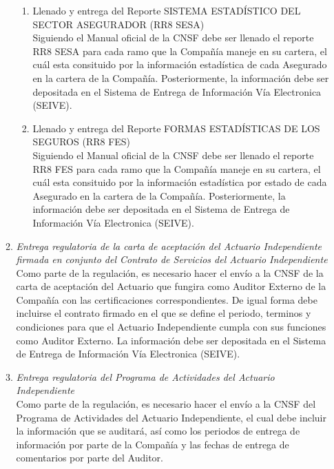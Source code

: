 \documentclass[11pt,twoside,openright,spanish]{report}
\numberwithin{equation}{chapter}
\numberwithin{figure}{chapter}
\numberwithin{table}{chapter}
\begin{document}
\begin{singlespace}
\begin{enumerate}
\begin{enumerate}
\begin{enumerate}
				\item {Llenado y entrega del Reporte SISTEMA ESTADÍSTICO DEL SECTOR ASEGURADOR (RR8 SESA)} \\ \-\hspace{0.5cm}
				Siguiendo el Manual oficial de la CNSF debe ser llenado el reporte RR8 SESA para cada ramo que la Compañía maneje en su cartera, el cuál esta consituido por la información estadística de cada Asegurado en la cartera de la Compañía. Posteriormente, la información debe ser depositada en el Sistema de Entrega de Información Vía Electronica (SEIVE).
				\item {Llenado y entrega del Reporte FORMAS ESTADÍSTICAS DE LOS SEGUROS (RR8 FES)} \\ \-\hspace{0.5cm}
				Siguiendo el Manual oficial de la CNSF debe ser llenado el reporte RR8 FES para cada ramo que la Compañía maneje en su cartera, el cuál esta consituido por la información estadística por estado de cada Asegurado en la cartera de la Compañía. Posteriormente, la información debe ser depositada en el Sistema de Entrega de Información Vía Electronica (SEIVE).
			\end{enumerate}
			\item \textit{Entrega regulatoria de la carta de aceptación del Actuario Independiente firmada en conjunto del Contrato de Servicios del Actuario Independiente} \\ \-\hspace{0.5cm}
			Como parte de la regulación, es necesario hacer el envío a la CNSF de la carta de aceptación del Actuario que fungira como Auditor Externo de la Compañía con las certificaciones correspondientes. De igual forma debe incluirse el contrato firmado en el que se define el periodo, terminos y condiciones para que el Actuario Independiente cumpla con sus funciones como Auditor Externo. La información debe ser depositada en el Sistema de Entrega de Información Vía Electronica (SEIVE).
			\item \textit{Entrega regulatoria del Programa de Actividades del Actuario Independiente} \\ \-\hspace{0.5cm}
			Como parte de la regulación, es necesario hacer el envío a la CNSF del Programa de Actividades del Actuario Independiente, el cual debe incluir la información que se auditará, así como los periodos de entrega de información por parte de la Compañía y las fechas de entrega de comentarios por parte del Auditor. 
		\end{enumerate}

\end{enumerate}
\end{singlespace}
\end{document}
